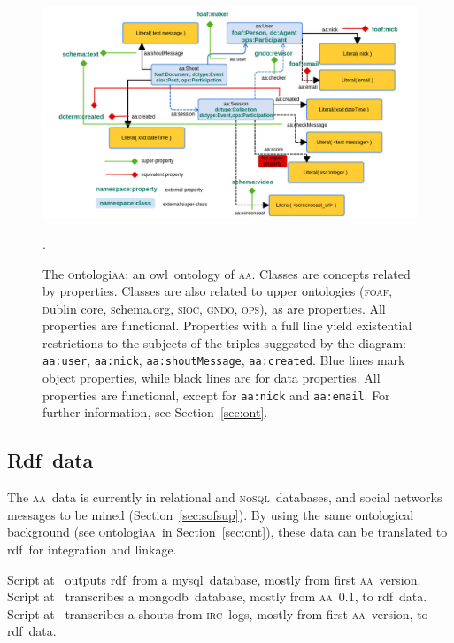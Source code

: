 \documentclass[a4paper, 11pt]{article} %
\newcommand{\schema}{\textsc{s}chema.org}
\newcommand{\nosql}{\textsc{n}o\textsc{sql}}
\newcommand{\irc}{\textsc{irc}}
\newcommand{\foaf}{\textsc{foaf}}
\newcommand{\ops}{\textsc{ops}}
\newcommand{\sioc}{\textsc{sioc}}
\newcommand{\gndo}{\textsc{gndo}}
\newcommand{\aab}{\textsc{aa}}
\newcommand{\dc}{\textsc{d}ublin {\sc c}ore}
\newcommand{\ontologiaa}{\textsc{o}ntologi\textsc{aa}}
\newcommand{\owl}{{\sc owl}}
\newcommand{\rdfi}{{\sc Rdf}}
\newcommand{\mongodb}{{\sc m}ongo{\sc db}}
\newcommand{\mysql}{{\sc m}y{\sc sql}}
\newcommand{\rdf}{{\sc rdf}}
\begin{document}
\begin{figure}[!h]
    \hspace{-3.3cm}
    \includegraphics[width=1.5\textwidth]{imgs/ontologiaa_}
    \caption{The \ontologiaa: an \owl\ ontology of \aab. Classes are concepts related by properties. Classes are also related to upper ontologies (\foaf, \dc, \schema, \sioc, \gndo, \ops), as are properties. All properties are functional. Properties with a full line yield existential restrictions to the subjects of the triples suggested by the diagram: {\tt aa:user}, {\tt aa:nick}, {\tt aa:shoutMessage}, {\tt aa:created}. Blue lines mark object properties, while black lines are for data properties. All properties are functional, except for {\tt aa:nick} and {\tt aa:email}. For further information, see Section~\ref{sec:ont}.}.
    \label{fig:ontologiaa}
\end{figure}


\subsection{\rdfi\ data}
The \aab\ data is currently in relational and \nosql\ databases, and social networks messages to be mined (Section~\ref{sec:sofsup}). By using the same ontological background (see \ontologiaa\ in Section~\ref{sec:ont}), these data can be translated to \rdf\ for integration and linkage.

Script at~\cite{mysqlTri} outputs \rdf\ from a \mysql\ database, mostly from first \aab\ version.
Script at~\cite{mongoTri} transcribes a \mongodb\ database, mostly from \aab\ 0.1, to \rdf\ data.
Script at~\cite{ircTri} transcribes a shouts from \irc\ logs, mostly from first \aab\ version, to \rdf\ data.
\end{document}

